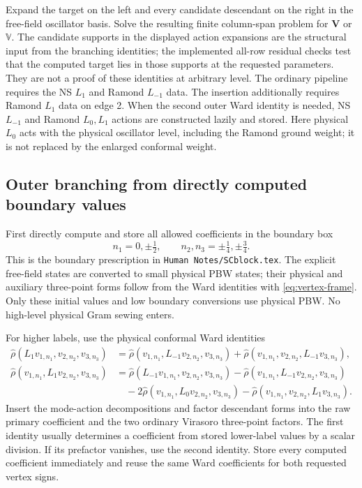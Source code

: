 \documentclass[11pt]{article}
\numberwithin{equation}{section}
\begin{document}
Expand the target on the left and every candidate descendant on the right
in the free-field oscillator basis. Solve the resulting finite column-span
problem for $\mathbf V$ or $\mathbb V$. The candidate supports in the
displayed action expansions are the structural input from the branching identities;
the implemented all-row residual checks test that the computed target lies
in those supports at the requested parameters. They are not a proof of
these identities at arbitrary level.
The ordinary pipeline requires the NS $L_1$ and Ramond $L_{-1}$ data.
The insertion additionally requires Ramond $L_1$ data on edge 2.
When the second outer Ward identity is needed, NS $L_{-1}$ and Ramond
$L_0,L_1$ actions are constructed lazily and stored. Here physical $L_0$
acts with the physical oscillator level, including the Ramond ground weight;
it is not replaced by the enlarged conformal weight.

\subsection{Outer branching from directly computed boundary values}
\label{sec:outer-recursion}
First directly compute and store all allowed coefficients in the boundary box
\begin{equation}
 n_1=0,\pm\tfrac12,\qquad n_2,n_3=\pm\tfrac14,\pm\tfrac34.
\end{equation}
This is the boundary prescription in \texttt{Human Notes/SCblock.tex}.
The explicit free-field states are converted to small physical PBW states;
their physical and auxiliary three-point forms follow from the Ward identities
with \eqref{eq:vertex-frame}. Only these initial values and low boundary
conversions use physical PBW. No high-level physical Gram sewing enters.

For higher labels, use the physical conformal Ward identities
\begin{align}
 \hat\rho(L_1v_{1,n_1},v_{2,n_2},v_{3,n_3})
 &=\hat\rho(v_{1,n_1},L_{-1}v_{2,n_2},v_{3,n_3})
  +\hat\rho(v_{1,n_1},v_{2,n_2},L_{-1}v_{3,n_3}),
 \label{eq:outer-ward}\\
 \hat\rho(v_{1,n_1},L_1v_{2,n_2},v_{3,n_3})
 &=\hat\rho(L_{-1}v_{1,n_1},v_{2,n_2},v_{3,n_3})
   -\hat\rho(v_{1,n_1},L_{-1}v_{2,n_2},v_{3,n_3})\nonumber\\
 &\quad-2\hat\rho(v_{1,n_1},L_0v_{2,n_2},v_{3,n_3})
   -\hat\rho(v_{1,n_1},v_{2,n_2},L_1v_{3,n_3}).
 \label{eq:outer-ward-second}
\end{align}
Insert the mode-action decompositions and factor descendant forms into the
raw primary coefficient and the two ordinary Virasoro three-point factors.
The first identity usually determines a coefficient from stored lower-label
values by a scalar division. If its prefactor vanishes, use the second
identity. Store every computed coefficient immediately and reuse the same
Ward coefficients for both requested vertex signs.
\end{document}
